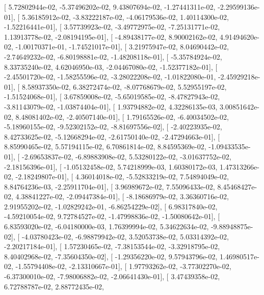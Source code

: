 \documentclass{article}
\begin{document}
       [  5.72802944e-02,  -5.37496202e-02,   9.43807694e-02,
         -1.27441311e-02,  -2.29599136e-01],
       [  5.36185912e-02,  -3.83222187e-02,  -4.06179536e-02,
          1.40114300e-02,  -1.52216441e-01],
       [  3.57739923e-02,  -3.49772975e-02,  -7.25131771e-02,
          1.13913778e-02,  -2.08194195e-01],
       [ -4.89438177e-02,   8.90002162e-02,   4.91494620e-02,
         -1.00170371e-01,  -1.74521017e-01],
       [  3.21975947e-02,   8.04690442e-02,  -2.74649232e-02,
         -6.80198881e-02,  -1.48208118e-01],
       [ -5.35784924e-02,   8.33735240e-02,   4.62046950e-03,
         -2.04467080e-02,  -1.52377182e-01],
       [ -2.45501720e-02,  -1.58255596e-02,  -3.28022208e-02,
         -1.01822080e-01,  -2.45929218e-01],
       [  8.58937350e-02,   6.38272474e-02,  -8.07768679e-02,
          5.52955197e-02,  -1.51524068e-01],
       [  3.67859008e-02,  -5.65019585e-02,  -8.47827943e-02,
         -3.81143079e-02,  -1.03874404e-01],
       [  1.93794882e-02,   4.32286135e-03,   3.00851642e-02,
          8.48081402e-02,  -2.40507140e-01],
       [  1.79165526e-02,  -6.40034502e-02,  -5.18960155e-02,
         -9.52302152e-02,  -8.81697556e-02],
       [ -2.40223935e-02,   8.42733625e-02,  -5.12668294e-02,
         -2.61750140e-02,  -2.47294663e-01],
       [  8.85990465e-02,   5.57194115e-02,   6.70861814e-02,
          8.84595369e-02,  -1.09433535e-01],
       [ -2.69653837e-02,  -6.89883908e-02,   5.53280122e-02,
         -3.01637752e-02,  -2.18156396e-01],
       [ -1.05132458e-02,   5.74218999e-03,   1.60380172e-03,
          1.47313266e-02,  -2.18249807e-01],
       [  4.36014018e-02,  -5.52833219e-02,   7.54894049e-02,
          8.84764236e-03,  -2.25911704e-01],
       [  3.96989672e-02,   7.55096433e-02,   8.45468427e-02,
          4.38841227e-02,  -2.09447384e-01],
       [ -8.18686979e-02,   3.36360716e-02,   2.91955202e-02,
         -1.02829242e-01,  -6.86254229e-02],
       [  6.98317840e-02,  -4.59210054e-02,   9.72784527e-02,
         -1.47998836e-02,  -1.50080642e-01],
       [  6.83593020e-02,  -6.04180000e-03,   1.76399994e-02,
          5.34622634e-02,  -9.88948875e-02],
       [ -4.03780423e-02,  -6.98879942e-02,   3.52053738e-02,
          5.03314392e-02,  -2.20217184e-01],
       [  1.57230465e-02,  -7.38153544e-02,  -3.32918795e-02,
          8.40402968e-02,  -7.35604350e-02],
       [ -1.29356220e-02,   9.57943796e-02,   1.46980517e-02,
         -1.55794408e-02,  -2.13310667e-01],
       [  1.97793262e-02,  -3.77302270e-02,  -6.37300010e-02,
         -7.98006882e-02,  -2.06641430e-01],
       [  3.47439358e-02,   6.72788787e-02,   2.88772435e-02,
\end{document}
